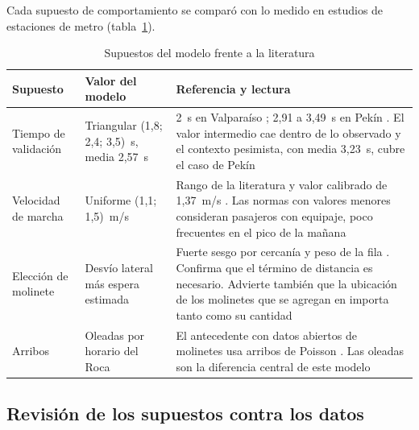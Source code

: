 Cada supuesto de comportamiento se comparó con lo medido en estudios de estaciones de metro
(tabla~\ref{tab:contraste}).

\begin{table}[H]
\centering
\caption{Supuestos del modelo frente a la literatura}
\label{tab:contraste}
\small
\begin{tabularx}{\textwidth}{@{}>{\raggedright\arraybackslash}p{2.6cm} >{\raggedright\arraybackslash}p{3.2cm} X@{}}
\toprule
Supuesto & Valor del modelo & Referencia y lectura \\
\midrule
Tiempo de validación & Triangular (1,8; 2,4; 3,5)~s, media 2,57~s &
2~s en Valparaíso \parencite{seriani2025}; 2,91 a 3,49~s en Pekín \parencite{wang2024}. El valor
intermedio cae dentro de lo observado y el contexto pesimista, con media 3,23~s, cubre el caso de Pekín \\
Velocidad de marcha & Uniforme (1,1; 1,5)~m/s &
Rango de la literatura y valor calibrado de 1,37~m/s \parencite{li2024}. Las normas con valores menores
consideran pasajeros con equipaje, poco frecuentes en el pico de la mañana \parencite{tian2026} \\
Elección de molinete & Desvío lateral más espera estimada &
Fuerte sesgo por cercanía \parencite{seriani2025,tian2026} y peso de la fila \parencite{wang2024}.
Confirma que el término de distancia es necesario. Advierte también que la ubicación de los molinetes que
se agregan en \EI{} importa tanto como su cantidad \\
Arribos & Oleadas por horario del Roca & El antecedente con datos abiertos de molinetes usa arribos de
Poisson \parencite{zhen2024}. Las oleadas son la diferencia central de este modelo \\
\bottomrule
\end{tabularx}
\end{table}

\subsection{Revisión de los supuestos contra los datos}

